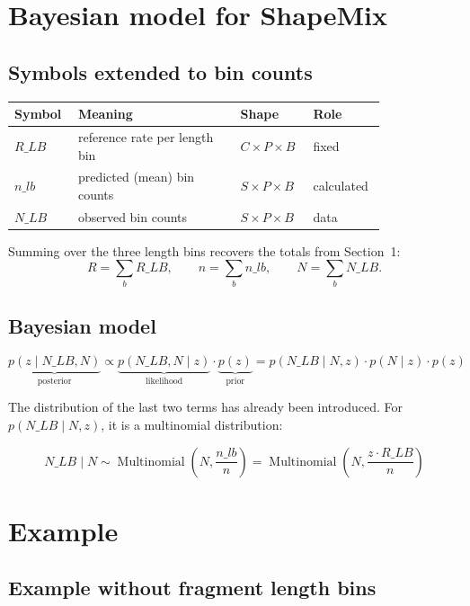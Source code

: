 \documentclass[11pt]{article}
\newcommand{\Mult}{\operatorname{Multinomial}}
\begin{document}
\section{Bayesian model for ShapeMix}

\subsection{Symbols extended to bin counts}

\begin{center}
\begin{tabular}{C{0.12\linewidth}L{0.40\linewidth}C{0.16\linewidth}L{0.14\linewidth}}
\toprule
Symbol & Meaning & Shape & Role \\
\midrule
\(R\_LB\) & reference rate per length bin & \(C\times P\times B\) & fixed \\
\(n\_lb\) & predicted (mean) bin counts & \(S\times P\times B\)  & calculated \\
\(N\_LB\) & observed bin counts & \(S\times P\times B\)  & data \\
\bottomrule
\end{tabular}
\end{center}

Summing over the three length bins recovers the totals from Section~1:
\[
R=\sum_b R\_LB,
\qquad
n=\sum_b n\_lb,
\qquad
N=\sum_b N\_LB.
\]

\subsection{Bayesian model}

\[
\underbrace{p(z\mid N\_LB, N)}_{\text{posterior}}
\propto
\underbrace{p(N\_LB, N \mid z)}_{\text{likelihood}} \cdot
\underbrace{p(z)}_{\text{prior}} = p(N\_LB \mid N, z) \cdot p(N \mid z) \cdot p(z)
\]

The distribution of the last two terms has already been introduced. For $p(N\_LB \mid N, z)$, it is a multinomial distribution:

\[
\boxed{
N\_LB\mid N
\sim
\Mult(N,\frac{n\_lb}{n})=\Mult(N,\frac{z \cdot R\_LB}{n})
}
\]

\section{Example}

\subsection{Example without fragment length bins}
\end{document}
